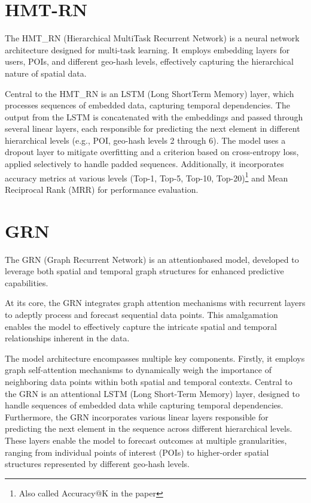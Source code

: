 \documentclass[twocolumn,twoside]{article}
\begin{document}
\section{HMT-RN}
The HMT\_RN (Hierarchical Multi\-Task Recurrent Network) is a
neural network architecture designed for multi-task learning. It employs
embedding layers for users, POIs, and different geo-hash levels,
effectively capturing the hierarchical nature of spatial data.

Central to the HMT\_RN is an LSTM (Long Short\-Term Memory) layer,
which processes sequences of embedded data, capturing temporal dependencies.
The output from the LSTM is concatenated with the embeddings
and passed through several linear layers, each responsible
for predicting the next element in different hierarchical
levels (e.g., POI, geo-hash levels 2 through 6). The model
uses a dropout layer to mitigate overfitting and a
criterion based on cross-entropy loss, applied selectively
to handle padded sequences. Additionally,
it incorporates accuracy metrics at various
levels (Top-1, Top-5, Top-10, Top-20)\footnote{Also called Accuracy@K in the paper\cite{main_paper}} and
Mean Reciprocal Rank (MRR) for performance
evaluation.
\section{GRN}
The GRN (Graph Recurrent Network) is an attention\-based model, developed to
leverage both spatial and temporal graph structures for enhanced predictive
capabilities.

At its core, the GRN integrates graph attention mechanisms
with recurrent layers to adeptly process and forecast sequential data points.
This amalgamation enables the model to effectively capture the intricate
spatial and temporal relationships inherent in the data.

The model architecture encompasses multiple key components. Firstly, it employs
graph self-attention mechanisms to dynamically weigh the importance of
neighboring data points within both spatial and temporal contexts.
Central to the GRN is an attentional LSTM (Long Short-Term Memory) layer,
designed to handle sequences of embedded data while capturing temporal
dependencies. Furthermore, the GRN incorporates various linear layers
responsible for predicting the next element in the sequence across
different hierarchical levels. These layers enable the model to forecast
outcomes at multiple granularities, ranging from individual points of interest
(POIs) to higher-order spatial structures represented by different geo-hash levels.
\end{document}

